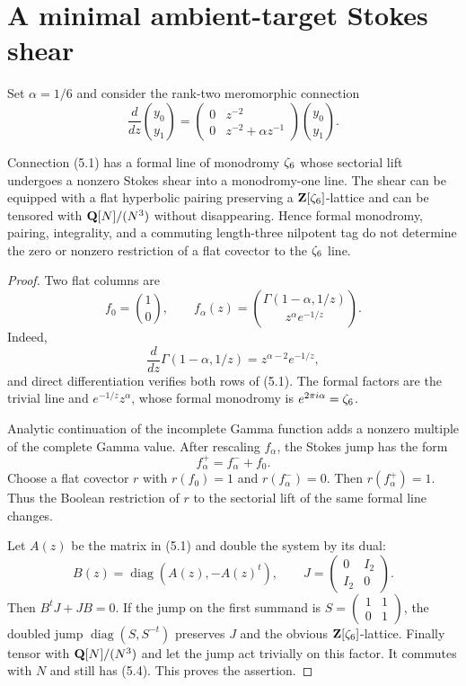 \section{A minimal ambient-target Stokes shear}
\label{sec:incomplete-gamma}

Set \(\alpha=1/6\) and consider the rank-two meromorphic connection
\[
 \frac{d}{dz}\binom{y_0}{y_1}=
 \begin{pmatrix}
 0&z^{-2}\\
 0&z^{-2}+\alpha z^{-1}
 \end{pmatrix}\binom{y_0}{y_1}.                              \tag{5.1}
\]

\begin{proposition}
\label{prop:incomplete-gamma}
Connection (5.1) has a formal line of monodromy \(\zeta_{6}\) whose sectorial
lift undergoes a nonzero Stokes shear into a monodromy-one line.  The shear
can be equipped with a flat hyperbolic pairing preserving a
\(\mathbf Z[\zeta_{6}]\)-lattice and can be tensored
with \(\mathbf Q[N]/(N^3)\) without disappearing.  Hence formal monodromy, pairing,
integrality, and a commuting length-three nilpotent tag do not determine the
zero or nonzero restriction of a flat covector to the \(\zeta_{6}\) line.
\end{proposition}

\begin{proof}
Two flat columns are
\[
 f_0=\binom10,
 \qquad
 f_\alpha(z)=
 \binom{\Gamma(1-\alpha,1/z)}{z^\alpha e^{-1/z}}.             \tag{5.2}
\]
Indeed,
\[
 \frac d{dz}\Gamma(1-\alpha,1/z)=z^{\alpha-2}e^{-1/z},       \tag{5.3}
\]
and direct differentiation verifies both rows of (5.1).  The formal factors
are the trivial line and \(e^{-1/z}z^\alpha\), whose formal monodromy is
\(e^{2\pi i\alpha}=\zeta_{6}\).

Analytic continuation of the incomplete Gamma function adds a nonzero
multiple of the complete Gamma value.  After rescaling \(f_\alpha\), the
Stokes jump has the form
\[
 f_\alpha^+=f_\alpha^-+f_0.                                  \tag{5.4}
\]
Choose a flat covector \(r\) with \(r(f_0)=1\) and
\(r(f_\alpha^-)=0\).  Then \(r(f_\alpha^+)=1\).  Thus the Boolean restriction
of \(r\) to the sectorial lift of the same formal line changes.

Let \(A(z)\) be the matrix in (5.1) and double the system by its dual:
\[
 B(z)=\operatorname{diag}(A(z),-A(z)^t),\qquad
 J=\begin{pmatrix}0&I_2\\I_2&0\end{pmatrix}.                 \tag{5.5}
\]
Then \(B^tJ+JB=0\).  If the jump on the first summand is
\(S=\left(\begin{smallmatrix}1&1\\0&1\end{smallmatrix}\right)\),
the doubled jump \(\operatorname{diag}(S,S^{-t})\) preserves \(J\) and the
obvious \(\mathbf Z[\zeta_{6}]\)-lattice.  Finally tensor with
\(\mathbf Q[N]/(N^3)\) and let the jump act trivially on this factor.  It commutes
with \(N\) and still has (5.4).  This proves the assertion.
\end{proof}

